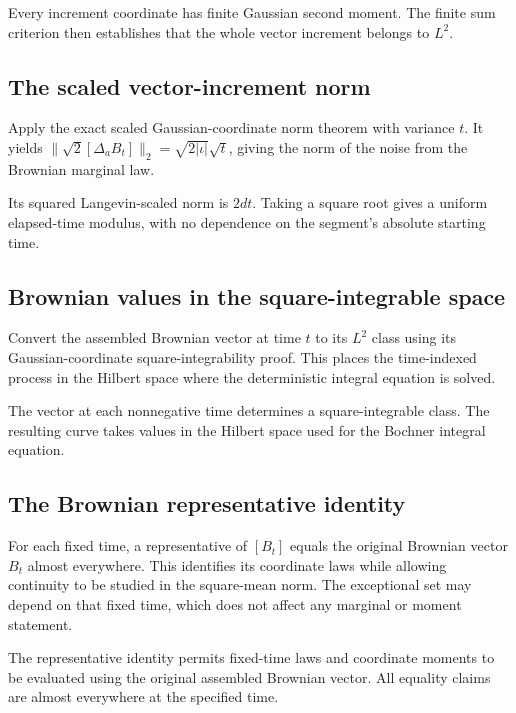 \documentclass[11pt,a4paper]{article}
\begin{document}
Every increment coordinate has finite Gaussian second moment. The finite sum criterion then establishes that the whole vector increment belongs to \(L^2\).


\subsection{\texorpdfstring{The scaled vector-increment norm}{The scaled vector-increment norm}}


Apply the exact scaled Gaussian-coordinate norm theorem with variance \(t\). It yields \(\|\sqrt2[\Delta_aB_t]\|_2=\sqrt{2|\iota|}\sqrt t\), giving the norm of the noise from the Brownian marginal law.



Its squared Langevin-scaled norm is \(2dt\). Taking a square root gives a uniform elapsed-time modulus, with no dependence on the segment's absolute starting time.


\subsection{\texorpdfstring{Brownian values in the square-integrable space}{Brownian values in the square-integrable space}}


Convert the assembled Brownian vector at time \(t\) to its \(L^2\) class using its Gaussian-coordinate square-integrability proof. This places the time-indexed process in the Hilbert space where the deterministic integral equation is solved.



The vector at each nonnegative time determines a square-integrable class. The resulting curve takes values in the Hilbert space used for the Bochner integral equation.


\subsection{\texorpdfstring{The Brownian representative identity}{The Brownian representative identity}}


For each fixed time, a representative of \([B_t]\) equals the original Brownian vector \(B_t\) almost everywhere. This identifies its coordinate laws while allowing continuity to be studied in the square-mean norm. The exceptional set may depend on that fixed time, which does not affect any marginal or moment statement.



The representative identity permits fixed-time laws and coordinate moments to be evaluated using the original assembled Brownian vector. All equality claims are almost everywhere at the specified time.
\end{document}
